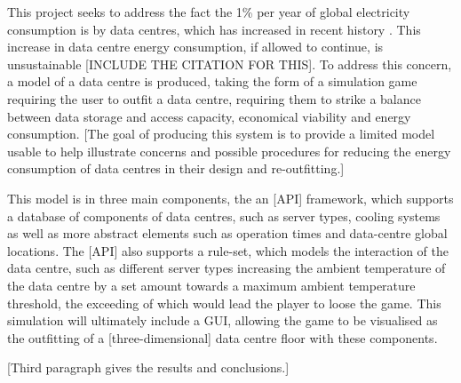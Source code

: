 

This project seeks to address the fact the 1\% per year of global electricity consumption is by data centres, which has increased in recent history \cite{KoomeyGrowthInDataCenterElectricityUse}. This increase in data centre energy consumption, if allowed to continue, is unsustainable [INCLUDE THE CITATION FOR THIS].
To address this concern, a model of a data centre is produced, taking the form of a simulation game requiring the user to outfit a data centre, requiring them to strike a balance between data storage and access capacity, economical viability and energy consumption. [The goal of producing this system is to provide a limited model usable to help illustrate concerns and possible procedures for reducing the energy consumption of data centres in their design and re-outfitting.]

\smallskip

This model is in three main components, the an [API] framework, which supports a database of components of data centres, such as server types, cooling systems as well as more abstract elements such as operation times and data-centre global locations. The [API] also supports a rule-set, which models the interaction of the data centre, such as different server types increasing the ambient temperature of the data centre by a set amount towards a maximum ambient temperature threshold, the exceeding of which would lead the player to loose the game. This simulation will ultimately include a GUI, allowing the game to be visualised as the outfitting of a [three-dimensional] data centre floor with these components.

\smallskip

[Third paragraph gives the results and conclusions.]


